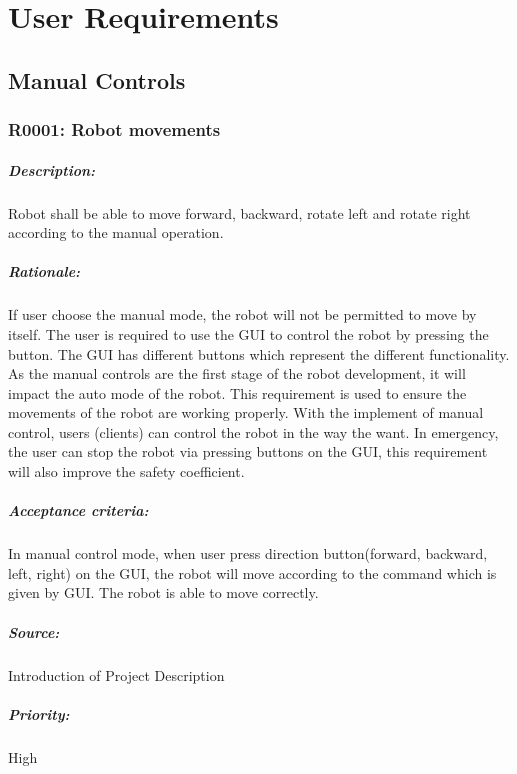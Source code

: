 \documentclass[11pt, a4paper]{report}
\begin{document}
\pagebreak




\chapter{User Requirements}
\section{Manual Controls}
\subsection{R0001: Robot movements}
\paragraph{Description: }
Robot shall be able to move forward, backward, rotate left and rotate right according to the manual operation.
\paragraph{Rationale: }
 If user choose the manual mode, the robot will not be permitted  to move by itself. The user is required to use the GUI to control the robot by pressing the button. The GUI has different buttons which represent the different functionality. As the manual controls are the first stage of the robot development, it will impact the auto mode of the robot. This requirement is used to ensure the movements of the robot are working properly. With the implement of manual control, users (clients) can control the robot in the way the want. In emergency, the user can stop the robot via pressing buttons on the GUI, this requirement will also improve the safety coefficient. 
\paragraph{Acceptance criteria: }
In manual control mode, when user press direction button(forward, backward, left, right) on the GUI, the robot will move according to the command which is given by GUI. The robot is able to move correctly.   
\paragraph{Source: }
 Introduction of Project Description
\paragraph{Priority: }
High
\end{document}

